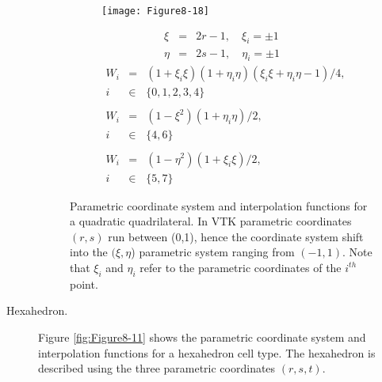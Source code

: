 \begin{description}
    \begin{figure}[!htb]
        \centering
        \begin{subfigure}{0.48\linewidth}
            \centering
            \texttt{[image: Figure8-18]}
            \caption*{}
        \end{subfigure}
        \hfill
        \begin{subfigure}{0.48\linewidth}
            \centering
            \begin{equation*}
            \begin{array}{lll}
            \xi &=& 2 r  - 1, \quad \xi_i = \pm 1 \\
            \eta &=& 2 s - 1, \quad \eta_i = \pm 1
            \end{array}
            \end{equation*}
            \begin{equation*}
            \begin{array}{lll}
            W_i &=& (1 + \xi_i \xi)(1 + \eta_i \eta)(\xi_i \xi + \eta_i \eta - 1)/4, \\
            i &\in& \lbrace 0, 1, 2, 3, 4 \rbrace \\ \\
            W_i &=& (1 - \xi^2)(1 + \eta_i \eta)/2,\\
            i &\in& \lbrace 4, 6 \rbrace  \\ \\
            W_i &=& (1 - \eta^2)(1 + \xi_i \xi)/2, \\
            i &\in& \lbrace 5, 7 \rbrace
            \end{array}
            \end{equation*}
        \end{subfigure}%
        \caption{Parametric coordinate system and interpolation functions for a quadratic quadrilateral. In VTK parametric coordinates $(r,s)$ run between (0,1), hence the coordinate system shift into the $(\xi, \eta$) parametric system ranging from $(-1,1)$. Note that $\xi_i$ and $\eta_i$ refer to the parametric coordinates of the $i^{th}$ point.}
        \label{fig:Figure8-18}
    \end{figure}

    \item[Hexahedron.] Figure \ref{fig:Figure8-11} shows the parametric coordinate system and interpolation functions for a hexahedron cell type. The hexahedron is described using the three parametric coordinates $(r,s,t)$.


\end{description}
